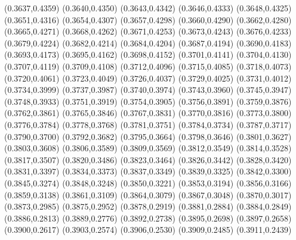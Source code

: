 \PST@Cross(0.3637,0.4359)
\PST@Cross(0.3640,0.4350)
\PST@Cross(0.3643,0.4342)
\PST@Cross(0.3646,0.4333)
\PST@Cross(0.3648,0.4325)
\PST@Cross(0.3651,0.4316)
\PST@Cross(0.3654,0.4307)
\PST@Cross(0.3657,0.4298)
\PST@Cross(0.3660,0.4290)
\PST@Cross(0.3662,0.4280)
\PST@Cross(0.3665,0.4271)
\PST@Cross(0.3668,0.4262)
\PST@Cross(0.3671,0.4253)
\PST@Cross(0.3673,0.4243)
\PST@Cross(0.3676,0.4233)
\PST@Cross(0.3679,0.4224)
\PST@Cross(0.3682,0.4214)
\PST@Cross(0.3684,0.4204)
\PST@Cross(0.3687,0.4194)
\PST@Cross(0.3690,0.4183)
\PST@Cross(0.3693,0.4173)
\PST@Cross(0.3695,0.4162)
\PST@Cross(0.3698,0.4152)
\PST@Cross(0.3701,0.4141)
\PST@Cross(0.3704,0.4130)
\PST@Cross(0.3707,0.4119)
\PST@Cross(0.3709,0.4108)
\PST@Cross(0.3712,0.4096)
\PST@Cross(0.3715,0.4085)
\PST@Cross(0.3718,0.4073)
\PST@Cross(0.3720,0.4061)
\PST@Cross(0.3723,0.4049)
\PST@Cross(0.3726,0.4037)
\PST@Cross(0.3729,0.4025)
\PST@Cross(0.3731,0.4012)
\PST@Cross(0.3734,0.3999)
\PST@Cross(0.3737,0.3987)
\PST@Cross(0.3740,0.3974)
\PST@Cross(0.3743,0.3960)
\PST@Cross(0.3745,0.3947)
\PST@Cross(0.3748,0.3933)
\PST@Cross(0.3751,0.3919)
\PST@Cross(0.3754,0.3905)
\PST@Cross(0.3756,0.3891)
\PST@Cross(0.3759,0.3876)
\PST@Cross(0.3762,0.3861)
\PST@Cross(0.3765,0.3846)
\PST@Cross(0.3767,0.3831)
\PST@Cross(0.3770,0.3816)
\PST@Cross(0.3773,0.3800)
\PST@Cross(0.3776,0.3784)
\PST@Cross(0.3778,0.3768)
\PST@Cross(0.3781,0.3751)
\PST@Cross(0.3784,0.3734)
\PST@Cross(0.3787,0.3717)
\PST@Cross(0.3790,0.3700)
\PST@Cross(0.3792,0.3682)
\PST@Cross(0.3795,0.3664)
\PST@Cross(0.3798,0.3646)
\PST@Cross(0.3801,0.3627)
\PST@Cross(0.3803,0.3608)
\PST@Cross(0.3806,0.3589)
\PST@Cross(0.3809,0.3569)
\PST@Cross(0.3812,0.3549)
\PST@Cross(0.3814,0.3528)
\PST@Cross(0.3817,0.3507)
\PST@Cross(0.3820,0.3486)
\PST@Cross(0.3823,0.3464)
\PST@Cross(0.3826,0.3442)
\PST@Cross(0.3828,0.3420)
\PST@Cross(0.3831,0.3397)
\PST@Cross(0.3834,0.3373)
\PST@Cross(0.3837,0.3349)
\PST@Cross(0.3839,0.3325)
\PST@Cross(0.3842,0.3300)
\PST@Cross(0.3845,0.3274)
\PST@Cross(0.3848,0.3248)
\PST@Cross(0.3850,0.3221)
\PST@Cross(0.3853,0.3194)
\PST@Cross(0.3856,0.3166)
\PST@Cross(0.3859,0.3138)
\PST@Cross(0.3861,0.3109)
\PST@Cross(0.3864,0.3079)
\PST@Cross(0.3867,0.3048)
\PST@Cross(0.3870,0.3017)
\PST@Cross(0.3873,0.2985)
\PST@Cross(0.3875,0.2952)
\PST@Cross(0.3878,0.2919)
\PST@Cross(0.3881,0.2884)
\PST@Cross(0.3884,0.2849)
\PST@Cross(0.3886,0.2813)
\PST@Cross(0.3889,0.2776)
\PST@Cross(0.3892,0.2738)
\PST@Cross(0.3895,0.2698)
\PST@Cross(0.3897,0.2658)
\PST@Cross(0.3900,0.2617)
\PST@Cross(0.3903,0.2574)
\PST@Cross(0.3906,0.2530)
\PST@Cross(0.3909,0.2485)
\PST@Cross(0.3911,0.2439)
